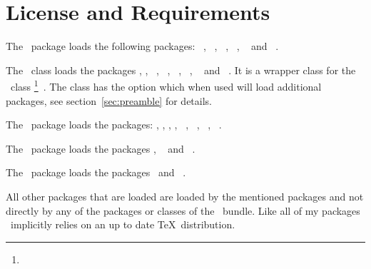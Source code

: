 \documentclass[load-preamble+,babel-options={ngerman,english}]{cnltx-doc}
\begin{document}
\section{License and Requirements}\label{sec:license}
\license

The \cnltxbase\ package loads the following packages:
~\cite{pkg:pgfopts},
~\cite{pkg:etoolbox},
\oberdiekfn~\cite{pkg:ltxcmds},
\oberdiekfn~\cite{pkg:pdftexcmds},
~\cite{pkg:trimspaces} and
~\cite{pkg:xcolor}.

The \cnltxdoc\ class loads the packages \cnltxbase, \cnltxexample,
~\cite{pkg:ulem},
~\cite{pkg:translations},
~\cite{pkg:multicol},
~\cite{pkg:ragged2e},
~\cite{pkg:marginnote} and
~\cite{pkg:hyperref}.  It is a wrapper class for the
\KOMAScript\ class
\footnote{}~\cite{bnd:koma-script}.  The
class has the option  which when used will load
additional packages, see section~\vref{sec:preamble} for details.

The \cnltxexample\ package loads the packages: \cnltxbase, \cnltxlistings,
\cnltxtools, ,
~\cite{pkg:mdframed},
~\cite{pkg:idxcmds},
~\cite{pkg:ifxetex},
~\cite{pkg:adjustbox}.

The \cnltxlistings\ package loads the packages \cnltxbase,
~\cite{pkg:listings} and
~\cite{pkg:catchfile}.

The \cnltxtools\ package loads the packages \cnltxbase\ and
\oberdiekfn~\cite{pkg:accsupp}.

All other packages that are loaded are loaded by the mentioned packages and
not directly by any of the packages or classes of the \cnltx\ bundle.  Like
all of my packages \cnltx\ implicitly relies on an up to date \TeX\
distribution.
\end{document}
